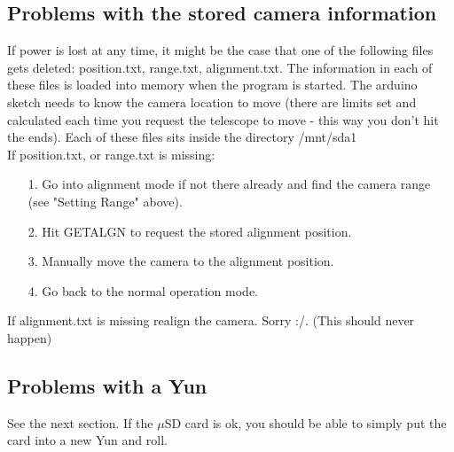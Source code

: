 \documentclass[11pt]{article}
\begin{document}
\subsection{Problems with the stored camera information}
If power is lost at any time, it might be the case that one of the following files gets deleted: position.txt, range.txt, alignment.txt. 
The information in each of these files is loaded into memory when the program is started.
The arduino sketch needs to know the camera location to move (there are limits set and calculated each time you request the telescope to move - this way you don't hit the ends).
Each of these files sits inside the directory /mnt/sda1\\[15pt]
If position.txt, or range.txt is missing:
\begin{enumerate}
\item[1.] Go into alignment mode if not there already and find the camera range (see "Setting Range" above).
\item[2.] Hit GETALGN to request the stored alignment position.
\item[3.] Manually move the camera to the alignment position.
\item[4.] Go back to the normal operation mode.
\end{enumerate}
If alignment.txt is missing realign the camera. Sorry :/. (This should never happen)

\subsection{Problems with a Yun}
See the next section.
If the $\mu$SD card is ok, you should be able to simply put the card into a new Yun and roll.
\end{document}
